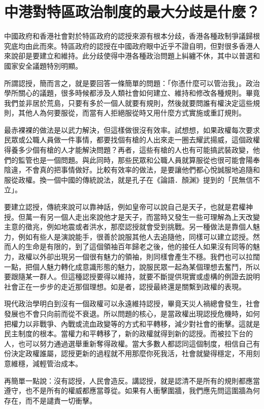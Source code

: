 \section{中港對特區政治制度的最大分歧是什麼？}
\label{sec:sec14}

中國政府和香港社會對於特區政府的認授來源有根本分歧，香港各種政制爭議歸根究底均由此而來。特區政府的認授在中國政府眼中近乎不證自明，但對很多香港人來說卻是要建立和維持。此分歧使得中港各種政治問題上糾纏不休，其中以普選和國家安全議題特別明顯。

所謂認授，簡而言之，就是要回答一條簡單的問題：「你憑什麼可以管治我」。政治學所關心的議題，很多時候都涉及人類社會如何建立、維持和修改各種規則。畢竟我們並非居於荒島，只要有多於一個人就要有規則，然後就要問誰有權決定這些規則，其他人為何要服從，而當有人拒絕服從時又用什麼方式實施或重訂規則。

最赤裸裸的做法是以武力解決，但這樣做很沒有效率。試想想，如果政權每次要求民眾或公職人員做一件事情，都要找個有槍的人出來走一圈去耀武揚威，這個政權得養多少個有槍的人才能解決問題？再者，這些有槍的人也有可能搞武裝政變，他們的監管也是一個問題。與此同時，那些民眾和公職人員就算服從也很可能會陽奉陰違，不會真的把事情做好。比較有效率的做法，是要讓他們都心悅誠服地追隨和服從政權。換一個中國的傳統說法，就是孔子在《論語．顏渊》提到的「民無信不立」。

要建立認授，傳統來說可以靠神話，例如皇帝可以說自己是天子，也就是君權神授。但萬一有另一個人走出來說他才是天子，而當時又發生一些可理解為上天改變主意的徵兆，例如地震或者洪水，那麼認授就會受到挑戰。另一種做法是靠個人魅力，例如有些人是演說能手，很善於說服其他人去追隨他，同樣可以建立認授。然而人的生命是有限的，到了這個領袖百年歸老之後，他的接任人如果沒有同等的魅力，政權以外卻出現另一個很有魅力的領袖，則同樣會產生不穩。我們也可以拉闊一點，把個人魅力轉化成意識形態的魅力，說服民眾一起為某個理想去奮鬥，所以要跟隨某一群人。但這種認授要得以維持，就要不斷提供現實或虛構的例證去說明社會正在一步步的走近那個理想。如是者，認授最終還是關繫到政權的表現。

現代政治學明白到沒有一個政權可以永遠維持認授，畢竟天災人禍總會發生，社會發展也不會只向前而從不衰退。所以問題的核心，是當政權出現認授危機時，如何把權力以非戰爭、內戰或流血政變等的方式和平轉移，減少對社會的衝擊。這就是民主制度的根本。當權力和平轉移了，新的政權就得到新的認授。而被拉下台的人，也可以努力通過選舉重新奪得政權。當大多數人都認同這個制度，相信自己有份決定政權誰屬，認授更新的過程就不用那麼你死我活，社會就變得穩定，不用刻意維穩，減輕管治成本。

再簡單一點說：沒有認授，人民會造反。講認授，就是認清不是所有的規則都應當遵守，也不是所有的權威都應當尊從。如果有人衝擊圍牆，我們應先問這圍牆為何存在，而不是譴責一切衝擊。

